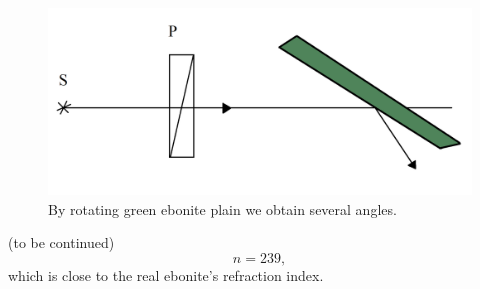 \begin{minipage}{0.55\textwidth}
    \begin{figure}[h]
    \centering
    \includegraphics[width=1\textwidth]{images/ebonit.png}
    \caption{By rotating green ebonite plain we obtain several angles.}
\end{figure}
\end{minipage}
\hfill
\begin{minipage}{0.35\textwidth}
(to be continued)
	 \begin{equation*}
	 	n = 239,
	 \end{equation*}
	 which is close to the real ebonite's refraction index.
\end{minipage}

